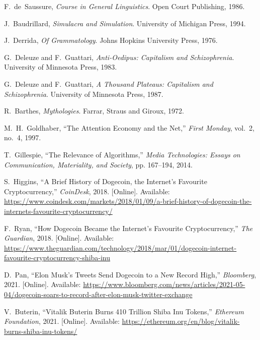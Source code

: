 \documentclass[a4paper,12pt]{article}
\begin{document}
\begin{thebibliography}{99}

F.~de~Saussure,
  \emph{Course in General Linguistics}.
  Open Court Publishing, 1986.

J.~Baudrillard,
  \emph{Simulacra and Simulation}.
  University of Michigan Press, 1994.

J.~Derrida,
  \emph{Of Grammatology}.
  Johns Hopkins University Press, 1976.

G.~Deleuze and F.~Guattari,
  \emph{Anti-Oedipus: Capitalism and Schizophrenia}.
  University of Minnesota Press, 1983.

G.~Deleuze and F.~Guattari,
  \emph{A Thousand Plateaus: Capitalism and Schizophrenia}.
  University of Minnesota Press, 1987.

R.~Barthes,
  \emph{Mythologies}.
  Farrar, Straus and Giroux, 1972.

M.~H.~Goldhaber,
  ``The Attention Economy and the Net,''
  \emph{First Monday}, vol.~2, no.~4, 1997.

T.~Gillespie,
  ``The Relevance of Algorithms,''
  \emph{Media Technologies: Essays on Communication, Materiality, and Society}, pp. 167--194, 2014.

S.~Higgins,
  ``A Brief History of Dogecoin, the Internet's Favourite Cryptocurrency,''
  \emph{CoinDesk}, 2018. [Online]. Available: \url{https://www.coindesk.com/markets/2018/01/09/a-brief-history-of-dogecoin-the-internets-favourite-cryptocurrency/}

F.~Ryan,
  ``How Dogecoin Became the Internet's Favourite Cryptocurrency,''
  \emph{The Guardian}, 2018. [Online]. Available: \url{https://www.theguardian.com/technology/2018/mar/01/dogecoin-internet-favourite-cryptocurrency-shiba-inu}

D.~Pan,
  ``Elon Musk's Tweets Send Dogecoin to a New Record High,''
  \emph{Bloomberg}, 2021. [Online]. Available:
  \url{https://www.bloomberg.com/news/articles/2021-05-04/dogecoin-soars-to-record-after-elon-musk-twitter-exchange}

V.~Buterin,
  ``Vitalik Buterin Burns 410 Trillion Shiba Inu Tokens,''
  \emph{Ethereum Foundation}, 2021. [Online]. Available:
  \url{https://ethereum.org/en/blog/vitalik-burns-shiba-inu-tokens/}


\end{thebibliography}
\end{document}
